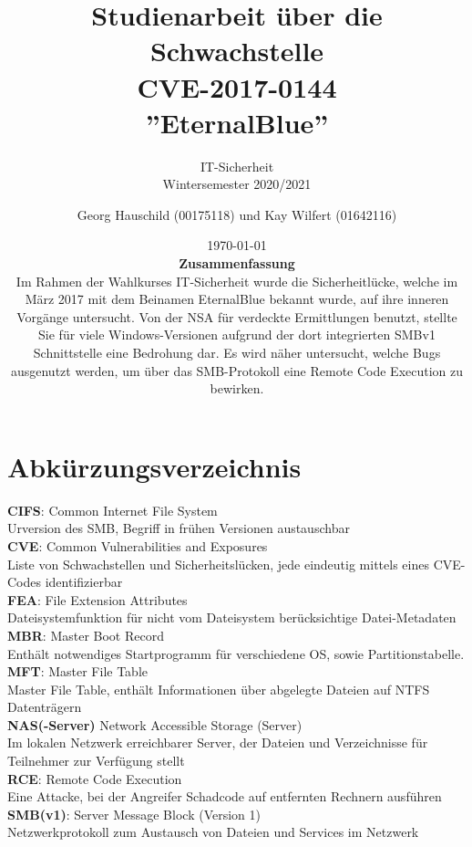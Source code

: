 \documentclass[DIV=12,headings=normal,pdftex,headinclude=false,footinclude=false,final]{scrreprt}
\title{Studienarbeit über die Schwachstelle\\CVE-2017-0144\\''EternalBlue''}
\subtitle{IT-Sicherheit\\Wintersemester 2020/2021}
\author{Georg Hauschild (00175118) und Kay Wilfert (01642116)}
\date{\today
\\
\textbf{Zusammenfassung}
\\
\justify
Im Rahmen der Wahlkurses IT-Sicherheit wurde die Sicherheitlücke, welche im März 2017 mit dem Beinamen EternalBlue bekannt wurde, auf ihre inneren Vorgänge untersucht.
Von der NSA für verdeckte Ermittlungen benutzt, stellte Sie für viele Windows-Versionen
aufgrund der dort integrierten SMBv1 Schnittstelle eine Bedrohung dar. Es wird näher untersucht, welche Bugs ausgenutzt werden, um über das SMB-Protokoll eine Remote Code Execution zu bewirken.
}
\begin{document}
\maketitle


\tableofcontents

\listoffigures

\chapter*{Abkürzungsverzeichnis}

\noindent
\textbf{CIFS}: Common Internet File System\\
Urversion des SMB, Begriff in frühen Versionen austauschbar\\

\noindent
\textbf{CVE}: Common Vulnerabilities and Exposures\\
Liste von Schwachstellen und Sicherheitslücken, jede eindeutig mittels eines CVE-Codes identifizierbar\\

\noindent
\textbf{FEA}: File Extension Attributes\\
Dateisystemfunktion für nicht vom Dateisystem berücksichtige Datei-Metadaten\\

\noindent
\textbf{MBR}: Master Boot Record\\
Enthält notwendiges Startprogramm für verschiedene OS, sowie Partitionstabelle.\\

\noindent
\textbf{MFT}: Master File Table\\
Master File Table, enthält Informationen über abgelegte Dateien auf NTFS Datenträgern\\

\noindent
\textbf{NAS(-Server)} Network Accessible Storage (Server)\\
Im lokalen Netzwerk erreichbarer Server, der Dateien und Verzeichnisse für Teilnehmer zur Verfügung stellt\\

\noindent
\textbf{RCE}: Remote Code Execution\\
Eine Attacke, bei der Angreifer Schadcode auf entfernten Rechnern ausführen\\

\noindent
\textbf{SMB(v1)}: Server Message Block (Version 1)\\
Netzwerkprotokoll zum Austausch von Dateien und Services im Netzwerk\\
\end{document}
